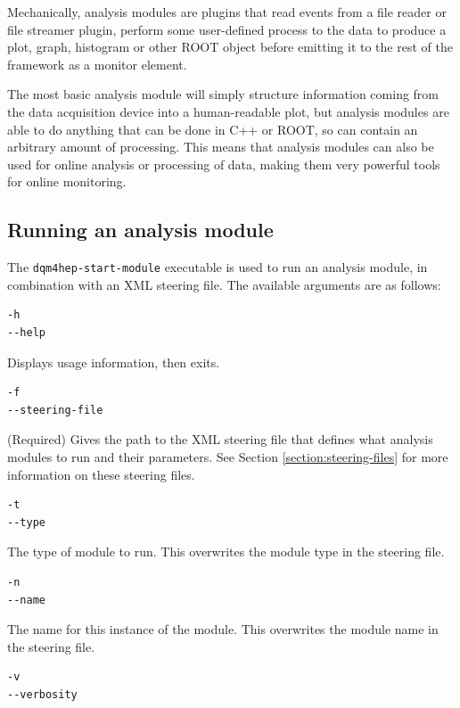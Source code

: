 Mechanically, analysis modules are plugins that read events from a file reader or file streamer plugin, perform some user-defined process to the data to produce a plot, graph, histogram or other ROOT object before emitting it to the rest of the framework as a monitor element.

The most basic analysis module will simply structure information coming from the data acquisition device into a human-readable plot, but analysis modules are able to do anything that can be done in C++ or ROOT, so can contain an arbitrary amount of processing. This means that analysis modules can also be used for online analysis or processing of data, making them very powerful tools for online monitoring. 

\subsection{Running an analysis module}
The \texttt{dqm4hep-start-module} executable is used to run an analysis module, in combination with an XML steering file. The available arguments are as follows:

\begin{lstlisting}
-h
--help
\end{lstlisting}

Displays usage information, then exits.

\begin{lstlisting}
-f
--steering-file
\end{lstlisting}

(Required) Gives the path to the XML steering file that defines what analysis modules to run and their parameters. See Section \ref{section:steering-files} for more information on these steering files. 

\begin{lstlisting}
-t
--type
\end{lstlisting}

The type of module to run. This overwrites the module type in the steering file.

\begin{lstlisting}
-n
--name
\end{lstlisting}

The name for this instance of the module. This overwrites the module name in the steering file.

\begin{lstlisting}
-v
--verbosity
\end{lstlisting}

